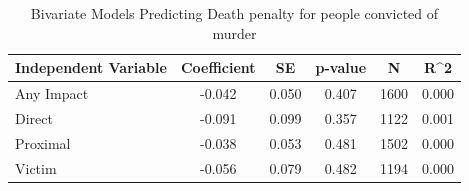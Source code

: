 \begin{table}

\caption{\label{tab:tab:dpen_rev_bivariate}Bivariate Models Predicting Death penalty for people convicted of murder}
\centering
\begin{tabular}[t]{lccccc}
\toprule
Independent Variable & Coefficient & SE & p-value & N & R\textasciicircum{}2\\
\midrule
Any Impact & -0.042 & 0.050 & 0.407 & 1600 & 0.000\\
Direct & -0.091 & 0.099 & 0.357 & 1122 & 0.001\\
Proximal & -0.038 & 0.053 & 0.481 & 1502 & 0.000\\
Victim & -0.056 & 0.079 & 0.482 & 1194 & 0.000\\
\bottomrule
\end{tabular}
\end{table}
